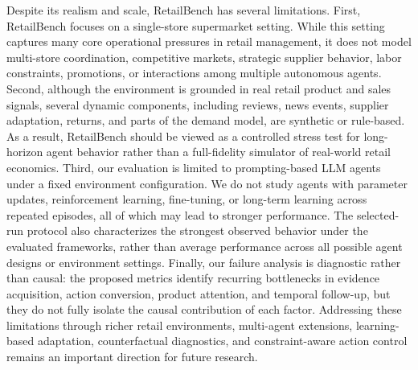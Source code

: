 Despite its realism and scale, RetailBench has several limitations. First, RetailBench focuses on a single-store supermarket setting. While this setting captures many core operational pressures in retail management, it does not model multi-store coordination, competitive markets, strategic supplier behavior, labor constraints, promotions, or interactions among multiple autonomous agents. Second, although the environment is grounded in real retail product and sales signals, several dynamic components, including reviews, news events, supplier adaptation, returns, and parts of the demand model, are synthetic or rule-based. As a result, RetailBench should be viewed as a controlled stress test for long-horizon agent behavior rather than a full-fidelity simulator of real-world retail economics.
Third, our evaluation is limited to prompting-based LLM agents under a fixed environment configuration. We do not study agents with parameter updates, reinforcement learning, fine-tuning, or long-term learning across repeated episodes, all of which may lead to stronger performance. The selected-run protocol also characterizes the strongest observed behavior under the evaluated frameworks, rather than average performance across all possible agent designs or environment settings. Finally, our failure analysis is diagnostic rather than causal: the proposed metrics identify recurring bottlenecks in evidence acquisition, action conversion, product attention, and temporal follow-up, but they do not fully isolate the causal contribution of each factor. 
Addressing these limitations through richer retail environments, multi-agent extensions, learning-based adaptation, counterfactual diagnostics, and constraint-aware action control remains an important direction for future research.